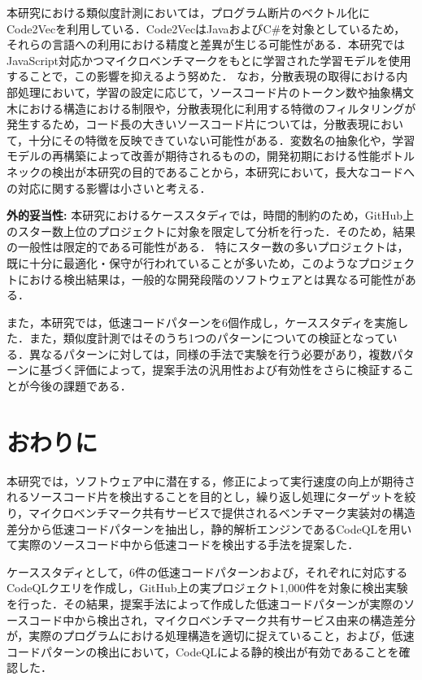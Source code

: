 \documentclass[submit,techrep,noauthor]{ipsj}
\begin{document}
本研究における類似度計測においては，プログラム断片のベクトル化にCode2Vecを利用している．Code2VecはJavaおよびC\#を対象としているため，それらの言語への利用における精度と差異が生じる可能性がある．本研究ではJavaScript対応かつマイクロベンチマークをもとに学習された学習モデル\cite{saiki}を使用することで，この影響を抑えるよう努めた．
なお，分散表現の取得における内部処理において，学習の設定に応じて，ソースコード片のトークン数や抽象構文木における構造における制限や，分散表現化に利用する特徴のフィルタリングが発生するため，コード長の大きいソースコード片については，分散表現において，十分にその特徴を反映できていない可能性がある．変数名の抽象化や，学習モデルの再構築によって改善が期待されるものの，開発初期における性能ボトルネックの検出が本研究の目的であることから，本研究において，長大なコードへの対応に関する影響は小さいと考える．

\noindent\textbf{外的妥当性: }
本研究におけるケーススタディでは，時間的制約のため，GitHub上のスター数上位のプロジェクトに対象を限定して分析を行った．そのため，結果の一般性は限定的である可能性がある．
特にスター数の多いプロジェクトは，既に十分に最適化・保守が行われていることが多いため，このようなプロジェクトにおける検出結果は，一般的な開発段階のソフトウェアとは異なる可能性がある．

また，本研究では，低速コードパターンを6個作成し，ケーススタディを実施した．また，類似度計測ではそのうち1つのパターンについての検証となっている．異なるパターンに対しては，同様の手法で実験を行う必要があり，複数パターンに基づく評価によって，提案手法の汎用性および有効性をさらに検証することが今後の課題である．


\section{おわりに}
\label{sec:summary}

本研究では，ソフトウェア中に潜在する，修正によって実行速度の向上が期待されるソースコード片を検出することを目的とし，繰り返し処理にターゲットを絞り，マイクロベンチマーク共有サービスで提供されるベンチマーク実装対の構造差分から低速コードパターンを抽出し，静的解析エンジンであるCodeQLを用いて実際のソースコード中から低速コードを検出する手法を提案した．

ケーススタディとして，6件の低速コードパターンおよび，それぞれに対応するCodeQLクエリを作成し，GitHub上の実プロジェクト1,000件を対象に検出実験を行った．その結果，提案手法によって作成した低速コードパターンが実際のソースコード中から検出され，マイクロベンチマーク共有サービス由来の構造差分が，実際のプログラムにおける処理構造を適切に捉えていること，および，低速コードパターンの検出において，CodeQLによる静的検出が有効であることを確認した．
\end{document}
